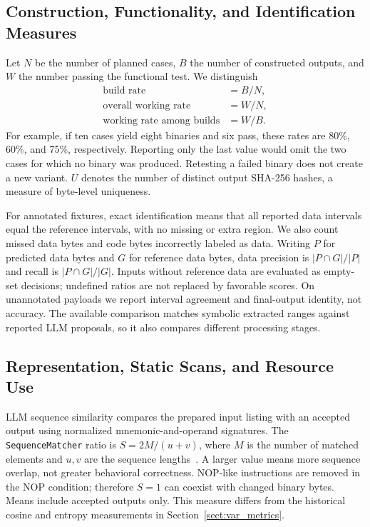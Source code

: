 \subsection{Construction, Functionality, and Identification Measures}
Let $N$ be the number of planned cases, $B$ the number of constructed
outputs, and $W$ the number passing the functional test. We distinguish
\[
  \begin{aligned}
  \text{build rate}&=B/N,\\
  \text{overall working rate}&=W/N,\\
  \text{working rate among builds}&=W/B.
  \end{aligned}
\]
For example, if ten cases yield eight binaries and six pass, these rates
are 80\%, 60\%, and 75\%, respectively. Reporting only the last value
would omit the two cases for which no binary was produced. Retesting a
failed binary does not create a new variant. $U$ denotes the number of
distinct output SHA-256 hashes, a measure of byte-level uniqueness.

For annotated fixtures, exact identification means that all reported data
intervals equal the reference intervals, with no missing or extra region.
We also count missed data bytes and code bytes incorrectly labeled as data.
Writing $P$ for predicted data bytes and $G$ for reference data bytes,
data precision is $|P\cap G|/|P|$ and recall is $|P\cap G|/|G|$.
Inputs without reference data are evaluated as empty-set decisions;
undefined ratios are not replaced by favorable scores. On unannotated
payloads we report interval agreement and final-output identity, not
accuracy. The available comparison matches symbolic extracted ranges
against reported LLM proposals, so it also compares different processing
stages.

\subsection{Representation, Static Scans, and Resource Use}
LLM sequence similarity compares the prepared input listing with an
accepted output using normalized mnemonic-and-operand signatures.
The \texttt{SequenceMatcher} ratio is $S=2M/(u+v)$, where $M$ is the
number of matched elements and $u,v$ are the sequence lengths~\cite{python_difflib}.
A larger value means more sequence overlap, not greater behavioral
correctness. NOP-like instructions are removed in the NOP condition;
therefore $S=1$ can coexist with changed binary bytes. Means include
accepted outputs only. This measure differs from the historical cosine
and entropy measurements in Section~\ref{sect:var_metrics}.

